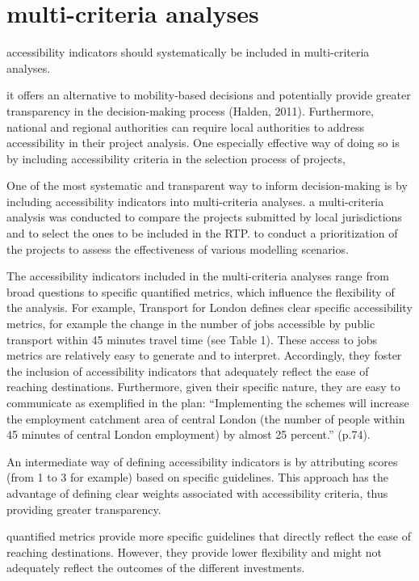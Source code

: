 \documentclass[12pt,]{article}
\begin{document}
\hypertarget{multi-criteria-analyses}{%
\section{multi-criteria analyses}\label{multi-criteria-analyses}}

accessibility indicators should systematically be included in
multi-criteria analyses.

it offers an alternative to mobility-based decisions and potentially
provide greater transparency in the decision-making process (Halden,
2011). Furthermore, national and regional authorities can require local
authorities to address accessibility in their project analysis. One
especially effective way of doing so is by including accessibility
criteria in the selection process of projects,

One of the most systematic and transparent way to inform decision-making
is by including accessibility indicators into multi-criteria analyses. a
multi-criteria analysis was conducted to compare the projects submitted
by local jurisdictions and to select the ones to be included in the RTP.
to conduct a prioritization of the projects to assess the effectiveness
of various modelling scenarios.

The accessibility indicators included in the multi-criteria analyses
range from broad questions to specific quantified metrics, which
influence the flexibility of the analysis. For example, Transport for
London defines clear specific accessibility metrics, for example the
change in the number of jobs accessible by public transport within 45
minutes travel time (see Table 1). These access to jobs metrics are
relatively easy to generate and to interpret. Accordingly, they foster
the inclusion of accessibility indicators that adequately reflect the
ease of reaching destinations. Furthermore, given their specific nature,
they are easy to communicate as exemplified in the plan: ``Implementing
the schemes will increase the employment catchment area of central
London (the number of people within 45 minutes of central London
employment) by almost 25 percent.'' (p.74).

An intermediate way of defining accessibility indicators is by
attributing scores (from 1 to 3 for example) based on specific
guidelines. This approach has the advantage of defining clear weights
associated with accessibility criteria, thus providing greater
transparency.

quantified metrics provide more specific guidelines that directly
reflect the ease of reaching destinations. However, they provide lower
flexibility and might not adequately reflect the outcomes of the
different investments.
\end{document}
